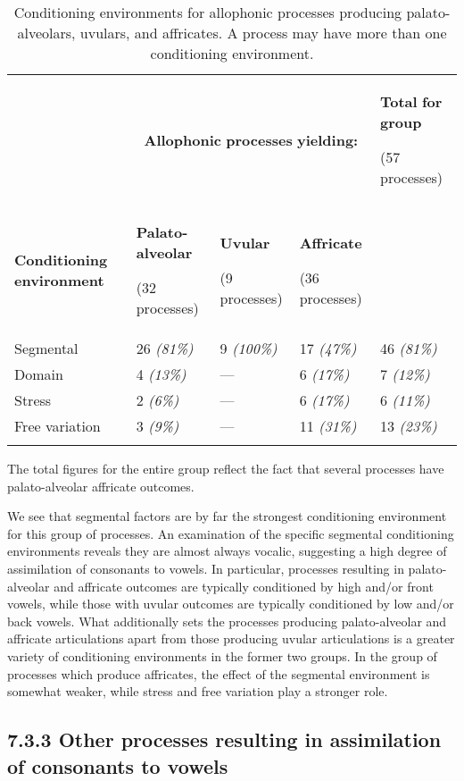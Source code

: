 \begin{table}
\begin{tabularx}{\textwidth}{XXXXX}
\lsptoprule
 & \multicolumn{3}{c}{ \textbf{Allophonic} \textbf{processes} \textbf{yielding:}} & { \textbf{Total} \textbf{for} \textbf{group}}

 (57 processes)\\
 \textbf{Conditioning} \textbf{environment} & { \textbf{Palato-alveolar}}

 (32 processes) & { \textbf{Uvular}}

 (9 processes) & { \textbf{Affricate}}

 (36 processes) & \\
 Segmental & 26 \textit{(81\%)} & 9 \textit{(100\%)} & 17 \textit{(47\%)} & 46 \textit{(81\%)}\\
 Domain & 4 \textit{(13\%)} & — & 6 \textit{(17\%)} & 7 \textit{(12\%)}\\
 Stress & 2 \textit{(6\%)} & — & 6 \textit{(17\%)} & 6 \textit{(11\%)}\\
 Free variation & 3 \textit{(9\%)} & — & 11 \textit{(31\%)} & 13 \textit{(23\%)}\\
\lspbottomrule
\end{tabularx}
\caption{\label{7.2}Conditioning environments for allophonic processes producing palato-alveolars, uvulars, and affricates. A process may have more than one conditioning environment.}The total figures for the entire group reflect the fact that several processes have palato-alveolar affricate outcomes.
\end{table}

  We see that segmental factors are by far the strongest conditioning environment for this group of processes. An examination of the specific segmental conditioning environments reveals they are almost always vocalic, suggesting a high degree of assimilation of consonants to vowels.  In particular, processes resulting in palato-alveolar and affricate outcomes are typically conditioned by high and/or front vowels, while those with uvular outcomes are typically conditioned by low and/or back vowels. What additionally sets the processes producing palato-alveolar and affricate articulations apart from those producing uvular articulations is a greater variety of conditioning environments in the former two groups. In the group of processes which produce affricates, the effect of the segmental environment is somewhat weaker, while stress and free variation play a stronger role.

\subsection{7.3.3 Other processes resulting in assimilation of consonants to vowels}

